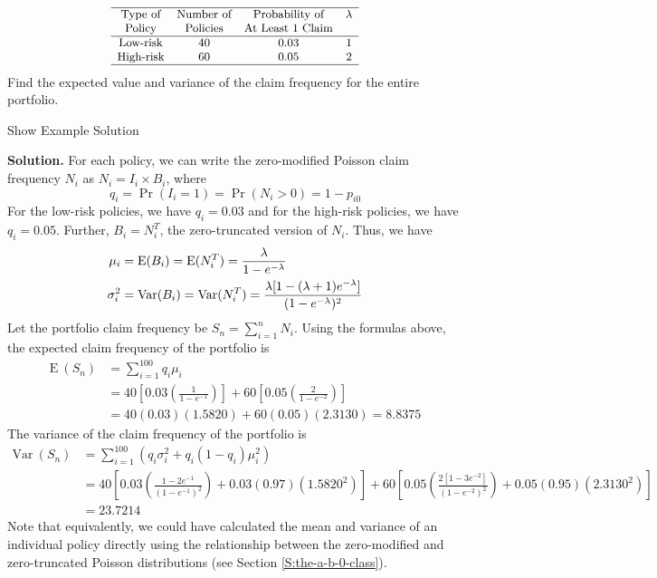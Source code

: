 \documentclass[]{book}
\theoremstyle{definition}
\theoremstyle{definition}
\theoremstyle{definition}
\theoremstyle{remark}
\begin{document}
\[
{\small 
\begin{matrix}
    \begin{array}{cccc} \hline
        \text{Type of} & \text{Number of}  & \text{Probability of} & \lambda \\
        \text{Policy} & \text{Policies}  &  \text{At Least 1 Claim} &  \\ \hline
        \text{Low-risk} & 40 & 0.03 & 1 \\
        \text{High-risk} & 60 & 0.05 & 2 \\ \hline
    \end{array}
\end{matrix}
}
\] Find the expected value and variance of the claim frequency for the
entire portfolio.

Show Example Solution

\hypertarget{toggleExampleAggLoss.2.2}{}
\textbf{Solution.} For each policy, we can write the zero-modified
Poisson claim frequency \(N_i\) as \(N_i = I_i \times B_i\), where
\[q_i = \Pr(I_i = 1) = \Pr(N_i > 0) = 1-p_{i0}\] For the low-risk
policies, we have \(q_i = 0.03\) and for the high-risk policies, we have
\(q_i=0.05\). Further, \(B_i = N_i^T\), the zero-truncated version of
\(N_i\). Thus, we have \[\begin{aligned}
\mu_i &={\rm E}(B_i) = {\rm E}(N_i^T) = \frac{\lambda}{1-e^{-\lambda}} \\
\sigma_i^2 &={\rm Var}(B_i) = {\rm Var}(N_i^T) = \frac{\lambda [1-(\lambda+1)e^{-\lambda}]}{(1-e^{-\lambda})^2}
\end{aligned}\] Let the portfolio claim frequency be
\(S_n = \sum_{i=1}^n N_i\). Using the formulas above, the expected claim
frequency of the portfolio is \[\begin{aligned}
    \mathrm{E~} (S_n) &= \sum_{i=1}^{100} q_i \mu_i \\
    & = 40\left[0.03 \left(\frac{1}{1-e^{-1}} \right) \right] + 60 \left[0.05 \left( \frac{2}{1-e^{-2}} \right) \right] \\
    &= 40(0.03)(1.5820) + 60(0.05)(2.3130) = 8.8375
\end{aligned}\] The variance of the claim frequency of the portfolio is
\[\begin{aligned}
    \mathrm{Var~}(S_n) &= \sum_{i=1}^{100} \left( q_i \sigma _i^2+q_i (1-q_i
    )\mu_i^2 \right) \\
    &= 40 \left[ 0.03 \left(\frac{1-2e^{-1}}{(1-e^{-1})^2} \right) + 0.03(0.97)(1.5820^2) \right] + 60 \left[0.05 \left( \frac{2[1-3e^{-2}]}{ (1-e^{-2})^2} \right) + 0.05(0.95)(2.3130^2) \right] \\
    &= 23.7214
\end{aligned}\] Note that equivalently, we could have calculated the
mean and variance of an individual policy directly using the
relationship between the zero-modified and zero-truncated Poisson
distributions (see Section \ref{S:the-a-b-0-class}).
\end{document}
